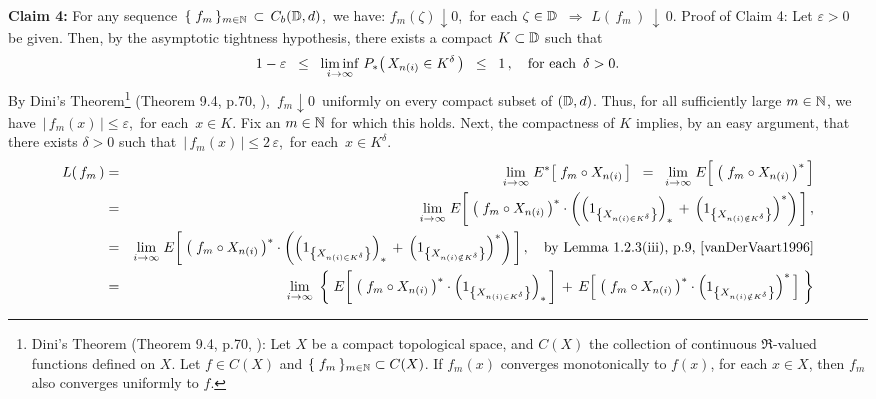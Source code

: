 \vskip 0.5cm
\noindent
\textbf{Claim 4:}\;\;
For any sequence \,$\{\;f_{m}\,\}_{m\in\mathbb{N}} \,\subset\, C_{b}(\mathbb{D},d)$,\,
we have:\;
$f_{m}(\zeta) \downarrow 0$,\, for each $\zeta \in \mathbb{D}$
\;\,$\Longrightarrow$\;
$L(\,f_{m}\,) \,\downarrow\, 0$.
\vskip 0.2cm
\noindent
Proof of Claim 4:\;\;
Let $\varepsilon > 0$ be given.
Then, by the asymptotic tightness hypothesis, there exists a compact $K \subset \mathbb{D}$ such that
\begin{equation*}
1 - \varepsilon
\;\; \leq \;\;
	\underset{i\rightarrow\infty}{\liminf}\; P_{*}\!\left(\,X_{n(i)} \in K^{\delta}\,\right)
\;\; \leq \;\;
	1\,,
\quad
\textnormal{for each \,$\delta > 0$}.
\end{equation*}
By Dini's Theorem\footnote{Dini's Theorem (Theorem 9.4, p.70, \cite{Aliprantis1998}):\;
Let $X$ be a compact topological space, and $C(X)$ the collection of continuous $\Re$-valued
functions defined on $X$. Let $f \in C(X)$ and $\{\;f_{m}\,\}_{m\in\mathbb{N}} \subset C(X)$.
If $f_{m}(x)$ converges monotonically to $f(x)$, for each $x \in X$,
then $f_{m}$ also converges uniformly to $f$.} (Theorem 9.4, p.70, \cite{Aliprantis1998}),
\,$f_{m} \downarrow 0$\, uniformly on every compact subset of $(\mathbb{D},d)$.
Thus, for all sufficiently large $m \in \mathbb{N}$, we have
\,$\vert\,f_{m}(x)\,\vert \leq \varepsilon$,\, for each \,$x \in K$.
Fix an $m \in \mathbb{N}$ for which this holds.
Next, the compactness of $K$ implies, by an easy argument,
that there exists $\delta > 0$ such that
\,$\vert\,f_{m}(x)\,\vert \leq  2\,\varepsilon$,\, for each \,$x \in K^{\delta}$.
\begin{eqnarray*}
L(\,f_{m}\,)
&=&
	\underset{i\rightarrow\infty}{\lim}\; E^{*}\!\left[\; f_{m} \circ X_{n(i)} \,\right]
\;\; = \;\;
	\underset{i\rightarrow\infty}{\lim}\; E\!\left[\; \left(\;f_{m} \circ X_{n(i)}\,\right)^{*} \,\right]
\\
&=&
	\underset{i\rightarrow\infty}{\lim}\;
	E\!\left[\;
		\left(\;f_{m} \circ X_{n(i)}\,\right)^{*}
		\cdot
		\left(
			\left(1_{\left\{X_{n(i) \in K^{\delta}}\right\}}\right)_{*}
			\,+\,
			\left(1_{\left\{X_{n(i) \notin K^{\delta}}\right\}}\right)^{*}
		\right)
	\,\right],
\\
&=&
	\underset{i\rightarrow\infty}{\lim}\;
	E\!\left[\;
		\left(\;f_{m} \circ X_{n(i)}\,\right)^{*}
		\cdot
		\left(
			\left(1_{\left\{X_{n(i) \in K^{\delta}}\right\}}\right)_{*}
			\,+\,
			\left(1_{\left\{X_{n(i) \notin K^{\delta}}\right\}}\right)^{*}
		\right)
	\,\right],
	\quad\textnormal{by Lemma 1.2.3(iii), p.9, \cite{vanDerVaart1996}}
\\
&=&
	\underset{i\rightarrow\infty}{\lim}\;
	\left\{\;
		E\!\left[\;
			\left(\;f_{m} \circ X_{n(i)}\,\right)^{*}
			\cdot
			\left(1_{\left\{X_{n(i) \in K^{\delta}}\right\}}\right)_{*}
		\,\right]
		\, + \,
		E\!\left[\;
			\left(\;f_{m} \circ X_{n(i)}\,\right)^{*}
			\cdot
			\left(1_{\left\{X_{n(i) \notin K^{\delta}}\right\}}\right)^{*}
		\,\right]
	\;\right\}
\end{eqnarray*}

